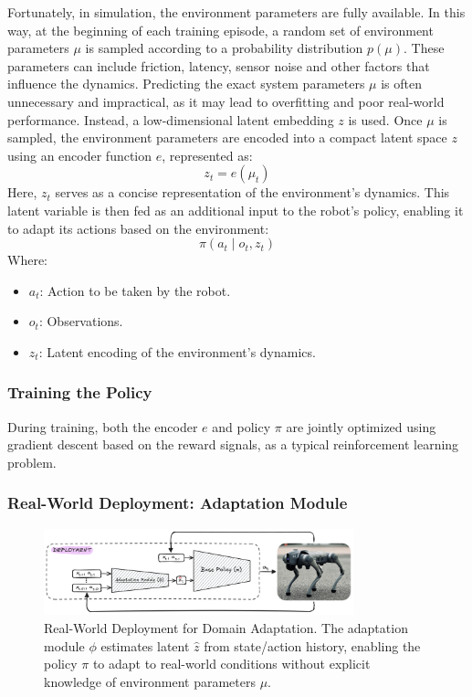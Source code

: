 Fortunately, in simulation, the environment parameters are fully available. In this way, at the beginning of each training episode, a random set of environment parameters $\mu$ is sampled according to a probability distribution $p(\mu)$. These parameters can include friction, latency, sensor noise and other factors that influence the dynamics. Predicting the exact system parameters $\mu$ is often unnecessary and impractical, as it may lead to overfitting and poor real-world performance. Instead, a low-dimensional latent embedding $z$ is used. Once $\mu$ is sampled, the environment parameters are encoded into a compact latent space $z$ using an encoder function $e$, represented as:
\begin{equation*}
	z_t = e(\mu_t)
\end{equation*}
Here, $z_t$ serves as a concise representation of the environment's dynamics. This latent variable is then fed as an additional input to the robot's policy, enabling it to adapt its actions based on the environment:
\begin{equation*}
	\pi(a_t \mid o_t, z_t)
\end{equation*}
Where:
\begin{itemize}
	\item $a_t$: Action to be taken by the robot.
	\item $o_t$: Observations.
	\item $z_t$: Latent encoding of the environment's dynamics.
\end{itemize}

\subsubsection{Training the Policy}

During training, both the encoder $e$ and policy $\pi$ are jointly optimized using gradient descent based on the reward signals, as a typical reinforcement learning problem.

\subsubsection{Real-World Deployment: Adaptation Module}

\begin{figure}[h]
	\centering
	\includegraphics[width=0.8\textwidth]{fig/domain-adaptation-deployment}
	\caption{Real-World Deployment for Domain Adaptation. The adaptation module $\phi$ estimates latent $\hat{z}$ from state/action history, enabling the policy $\pi$ to adapt to real-world conditions without explicit knowledge of environment parameters $\mu$.}
	\label{fig:deployment}
\end{figure}

